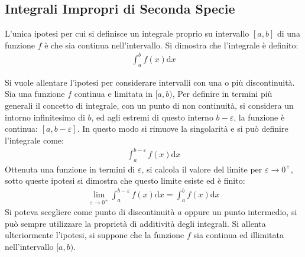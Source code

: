 \documentclass{article}
\numberwithin{equation}{subsection}
\begin{document}
\subsection{Integrali Impropri di Seconda Specie}

L'unica ipotesi per cui si definisce un integrale proprio su intervallo $[a,b]$ di una funzione $f$ è che sia continua nell'intervallo. Si dimostra che l'integrale è definito:
\begin{gather*}
    \displaystyle\int_a^b f(x)\mathrm{d}x
\end{gather*}

Si vuole allentare l'ipotesi per considerare intervalli con una o più discontinuità. Sia una funzione $f$ continua e limitata in $[a,b)$, 
Per definire in termini più generali il concetto di integrale, con un punto di non continuità, si considera un intorno infinitesimo di $b$, ed agli estremi di questo interno $b-\varepsilon$, la funzione è continua: $[a,b-\varepsilon]$. In questo modo si rimuove la singolarità e si può definire l'integrale come:
\begin{gather*}
    \displaystyle\int_a^{b-\varepsilon}f(x)\mathrm{d}x
\end{gather*}
Ottenuta una funzione in termini di $\varepsilon$, si calcola il valore del limite per $\varepsilon\to0^+$, sotto queste ipotesi si dimostra che questo limite esiste ed è finito:
\begin{gather}
    \lim_{\varepsilon\to0^+}\displaystyle\int_a^{b-\varepsilon}f(x)\mathrm{d}x=\int_a^bf(x)\mathrm{d}x
\end{gather}
Si poteva scegliere come punto di discontinuità $a$ oppure un punto intermedio, si può sempre utilizzare la proprietà di additività degli integrali. 
Si allenta ulteriormente l'ipotesi, si suppone che la funzione $f$ sia continua ed illimitata nell'intervallo $[a,b)$.  
\end{document}
